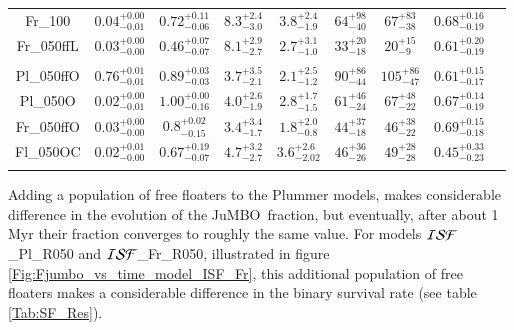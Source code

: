 \documentclass[submission,phys]{lib/SciPost}
\newcommand{\jumbo}{\mbox{JuMBO}}
\begin{document}
\begin{table}
\begin{tabular}{c c c c c c c c c}
           Fr\_100      & $0.04^{+0.00}_{-0.01}$ & $0.72^{+0.11}_{-0.06}$ & $8.3^{+2.4}_{-3.0}$ & $3.8^{+2.4}_{-1.9}$ & $64^{+98}_{-40}$ & $67^{+83}_{-38}$ & $0.68^{+0.16}_{-0.19}$ \vspace{0.25em}\\
           Fr\_050ffL  & $0.03^{+0.00}_{-0.00}$ & $0.46^{+0.07}_{-0.07}$ & $8.1^{+2.9}_{-2.7}$ & $2.7^{+3.1}_{-1.0}$ & $33^{+20}_{-18}$ & $20^{+15}_{-9}$ & $0.61^{+0.20}_{-0.19}$ \vspace{0.25em}\\
           \hline \vspace{-0.75em}\\
           Pl\_050ffO  & $0.76^{+0.01}_{-0.01}$ & $0.89^{+0.03}_{-0.03}$ & $3.7^{+3.5}_{-2.1}$ & $2.1^{+2.5}_{-1.2}$ & $90^{+86}_{-44}$ & $105^{+86}_{-47}$ & $0.61^{+0.15}_{-0.17}$ \vspace{0.25em}\\
           Pl\_050O    & $0.02^{+0.00}_{-0.01}$ & $1.00^{+0.00}_{-0.16}$ & $4.0^{+2.6}_{-1.9}$ & $2.8^{+1.7}_{-1.5}$ & $61^{+46}_{-24}$ & $67^{+48}_{-22}$ & $0.67^{+0.14}_{-0.19}$ \vspace{0.25em}\\
           Fr\_050ffO  & $0.03^{+0.00}_{-0.00}$ & $0.8^{+0.02}_{-0.15}$ & $3.4^{+3.4}_{-1.7}$ & $1.8^{+2.0}_{-0.8}$ & $44^{+37}_{-18}$ & $46^{+38}_{-22}$ & $0.69^{+0.15}_{-0.18}$ \vspace{0.25em}\\
           Fl\_050OC   & $0.02^{+0.01}_{-0.00}$ & $0.67^{+0.19}_{-0.07}$ & $4.7^{+3.2}_{-2.7}$ & $3.6^{+2.6}_{-2.02}$ & $46^{+36}_{-26}$ & $49^{+28}_{-28}$ & $0.45^{+0.33}_{-0.23}$ \vspace{0.25em}\\
           \hline
         \hline                                   %
         \label{Tab:Final_ISF_FFC_Results}
        \end{tabular}
     \end{table}

Adding a population of free floaters to the Plummer models, makes
considerable difference in the evolution of the \jumbo\, fraction, but
eventually, after about 1\,Myr their fraction converges to roughly the
same value.  For models ${\cal ISF}$\_Pl\_R050 and ${\cal
  ISF}$\_Fr\_R050, illustrated in
figure\,\ref{Fig:Fjumbo_vs_time_model_ISF_Fr}, this additional
population of free floaters makes a considerable difference in the
binary survival rate (see table\,\ref{Tab:SF_Res}).
\end{document}
